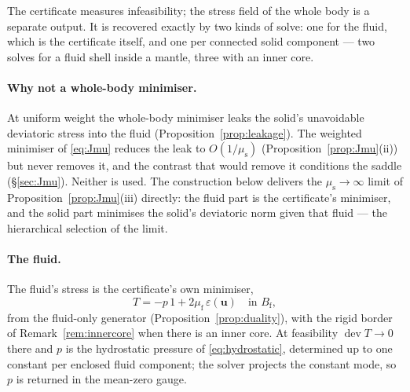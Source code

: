 \documentclass[11pt]{article}
\newcommand{\eps}{\varepsilon}
\newcommand{\Bf}{B_{\mathrm{f}}}
\newcommand{\bu}{\mathbf{u}}
\newcommand{\dev}{\operatorname{dev}}
\begin{document}
The certificate measures infeasibility; the stress field of the whole
body is a separate output. It is recovered exactly by two kinds of solve:
one for the fluid, which is the certificate itself, and one per
connected solid component --- two solves for a fluid shell inside a
mantle, three with an inner core.

\paragraph{Why not a whole-body minimiser.} At uniform weight the
whole-body minimiser leaks the solid's unavoidable deviatoric stress into
the fluid (Proposition~\ref{prop:leakage}). The weighted minimiser of
\eqref{eq:Jmu} reduces the leak to $O(1/\mu_{\mathrm{s}})$
(Proposition~\ref{prop:Jmu}(ii)) but never removes it, and the contrast
that would remove it conditions the saddle (\S\ref{sec:Jmu}). Neither is
used. The construction below delivers the $\mu_{\mathrm{s}}\to\infty$
limit of Proposition~\ref{prop:Jmu}(iii) directly: the fluid part is the
certificate's minimiser, and the solid part minimises the solid's
deviatoric norm given that fluid --- the hierarchical selection of the
limit.

\paragraph{The fluid.} The fluid's stress is the certificate's own
minimiser,
\begin{equation}
  T = -p\,1 + 2\mu_{\mathrm{f}}\,\eps(\bu) \quad\text{in } \Bf ,
\end{equation}
from the fluid-only generator (Proposition~\ref{prop:duality}), with the
rigid border of Remark~\ref{rem:innercore} when there is an inner core.
At feasibility $\dev T\to0$ there and $p$ is the hydrostatic pressure of
\eqref{eq:hydrostatic}, determined up to one constant per enclosed fluid
component; the solver projects the constant mode, so $p$ is returned in
the mean-zero gauge.
\end{document}
